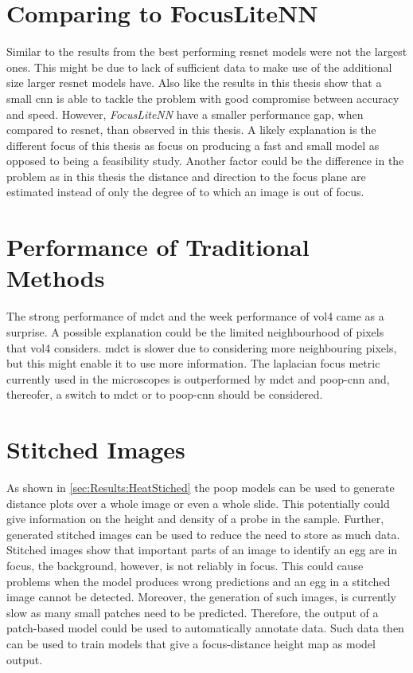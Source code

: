 \section{Comparing to FocusLiteNN}
\label{ch:Discussion:FocusLiteNN}

Similar to the results from \textcite{wang2020focuslitenn} the best performing \ac{resnet} models were not the largest ones. This might be due to lack of sufficient data to make use of the additional size larger \ac{resnet} models have. Also like \citeauthor{wang2020focuslitenn} the results in this thesis show that a small \ac{cnn} is able to tackle the problem with good compromise between accuracy and speed. However, \citeauthor{wang2020focuslitenn} \textit{FocusLiteNN} have a smaller performance gap, when compared to \ac{resnet}, than observed in this thesis. A likely explanation is the different focus of this thesis as \citeauthor{wang2020focuslitenn} focus on producing a fast and small model as opposed to being a feasibility study. Another factor could be the difference in the problem as in this thesis the distance and direction to the focus plane are estimated instead of only the degree of to which an image is out of focus.

\section{Performance of Traditional Methods}
\label{ch:Discussion:PerformanceTraditional}

The strong performance of \ac{mdct} and the week performance of \ac{vol4} came as a surprise. A possible explanation could be the limited neighbourhood of pixels that \ac{vol4} considers. \Ac{mdct} is slower due to considering more neighbouring pixels, but this might enable it to use more information. The \Ac{laplacian} focus metric currently used in the microscopes is outperformed by \ac{mdct} and \ac{poop}-\ac{cnn} and, thereofer, a switch to \ac{mdct} or to \ac{poop}-\ac{cnn} should be considered.

\section{Stitched Images}
\label{ch:Discussion:StitchedImages}

As shown in \autoref{sec:Results:HeatStiched} the \ac{poop} models can be used to generate distance plots over a whole image or even a whole slide. This potentially could give information on the height and density of a probe in the sample. Further, generated stitched images can be used to reduce the need to store as much data. Stitched images show that important parts of an image to identify an egg are in focus, the background, however, is not reliably in focus. This could cause problems when the model produces wrong predictions and an egg in a stitched image cannot be detected. Moreover, the generation of such images, is currently slow as many small patches need to be predicted. Therefore, the output of a patch-based model could be used to automatically annotate data. Such data then can be used to train models that give a focus-distance height map as model output.

